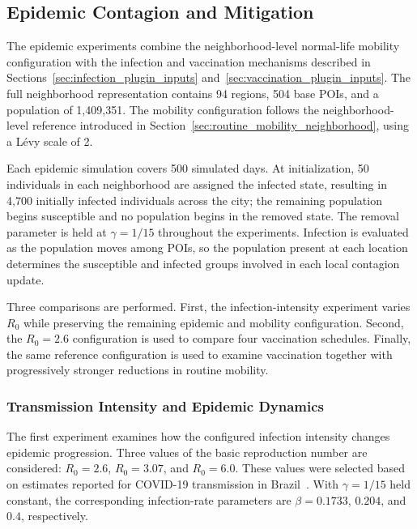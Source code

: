 \subsection{Epidemic Contagion and Mitigation}
\label{sec:results_epidemic_contagion}

The epidemic experiments combine the neighborhood-level normal-life mobility configuration with the infection and vaccination mechanisms described in Sections~\ref{sec:infection_plugin_inputs} and~\ref{sec:vaccination_plugin_inputs}. The full neighborhood representation contains 94 regions, 504 base POIs, and a population of 1,409,351. The mobility configuration follows the neighborhood-level reference introduced in Section~\ref{sec:routine_mobility_neighborhood}, using a L\'evy scale of 2.

Each epidemic simulation covers 500 simulated days. At initialization, 50 individuals in each neighborhood are assigned the infected state, resulting in 4,700 initially infected individuals across the city; the remaining population begins susceptible and no population begins in the removed state. The removal parameter is held at $\gamma=1/15$ throughout the experiments. Infection is evaluated as the population moves among POIs, so the population present at each location determines the susceptible and infected groups involved in each local contagion update.

Three comparisons are performed. First, the infection-intensity experiment varies $R_0$ while preserving the remaining epidemic and mobility configuration. Second, the $R_0=2.6$ configuration is used to compare four vaccination schedules. Finally, the same reference configuration is used to examine vaccination together with progressively stronger reductions in routine mobility.


\subsubsection{Transmission Intensity and Epidemic Dynamics}
\label{sec:results_epidemic_transmission}

The first experiment examines how the configured infection intensity changes epidemic progression. Three values of the basic reproduction number are considered: $R_0=2.6$, $R_0=3.07$, and $R_0=6.0$. These values were selected based on estimates reported for COVID-19 transmission in Brazil~\cite{dutra2020covidR0,deSouza2020covirR0,dutra2021covidR0}. With $\gamma=1/15$ held constant, the corresponding infection-rate parameters are $\beta=0.1733$, $0.204$, and $0.4$, respectively.

